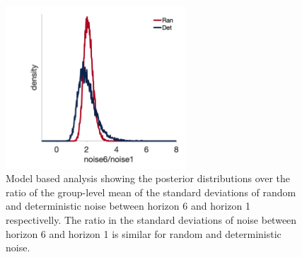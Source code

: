 \documentclass[12pt]{article}
\begin{document}
	\begin{figure}[hp]
		\begin{center}
			\includegraphics[width=0.6\textwidth]{figures/RanDetNoise_ratio1.png}
			\caption{Model based analysis showing the posterior distributions over the ratio of the group-level mean of the standard deviations of  random and deterministic noise between horizon 6 and horizon 1 respectivelly. The ratio in the standard deviations of noise between horizon 6 and horizon 1 is similar for random and deterministic noise.}
			\label{fig:ratio}
		\end{center}
	\end{figure}

	
	
\end{document}
